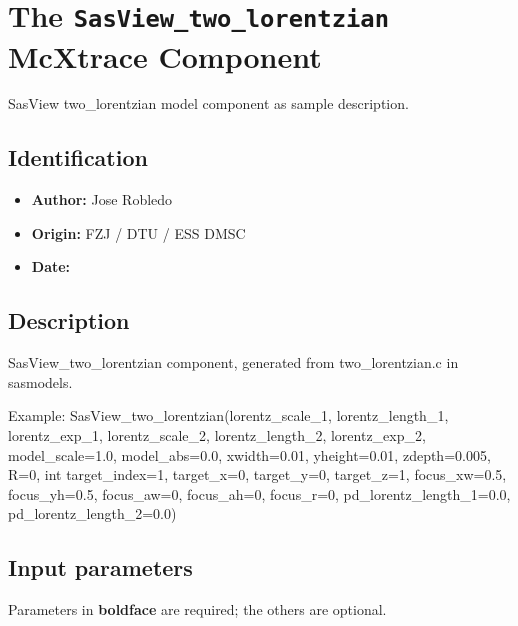 \section{The \texttt{SasView\_two\_lorentzian} McXtrace Component}
SasView two\_lorentzian model component as sample description.

\subsection*{Identification}
\begin{itemize}
  \item \textbf{Author:} Jose Robledo
  \item \textbf{Origin:} FZJ / DTU / ESS DMSC
  \item \textbf{Date:} 
\end{itemize}

\subsection*{Description}
SasView\_two\_lorentzian component, generated from two\_lorentzian.c in sasmodels.

Example: SasView\_two\_lorentzian(lorentz\_scale\_1, lorentz\_length\_1, lorentz\_exp\_1, lorentz\_scale\_2, lorentz\_length\_2, lorentz\_exp\_2, model\_scale=1.0, model\_abs=0.0, xwidth=0.01, yheight=0.01, zdepth=0.005, R=0, int target\_index=1, target\_x=0, target\_y=0, target\_z=1, focus\_xw=0.5, focus\_yh=0.5, focus\_aw=0, focus\_ah=0, focus\_r=0, pd\_lorentz\_length\_1=0.0, pd\_lorentz\_length\_2=0.0)

\subsection*{Input parameters}
Parameters in \textbf{boldface} are required; the others are optional.

